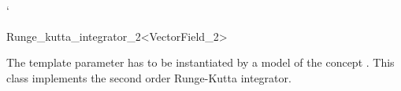 `%


\begin{ccRefFunctionObjectClass}{Runge_kutta_integrator_2<VectorField_2>}  %

\ccDefinition

The template parameter  has to
be instantiated by a model of the concept . This class implements the second order Runge-Kutta integrator.


\ccIsModel 

 \\

\ccSeeAlso
{} \\
\end{ccRefFunctionObjectClass}


